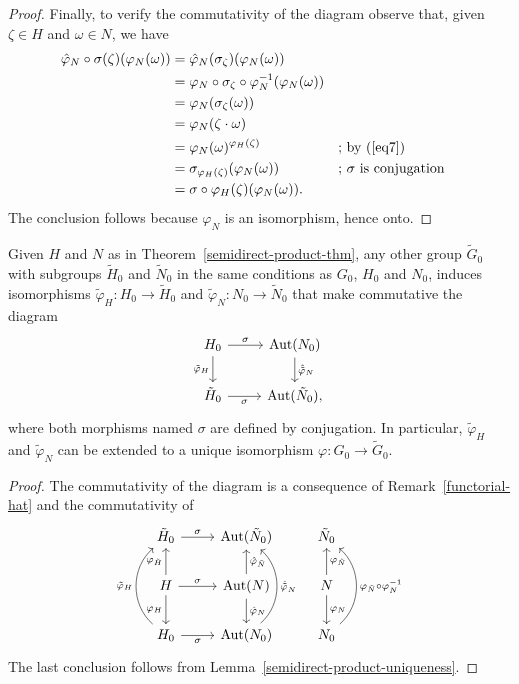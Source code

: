 \begin{proof}
Finally, to verify the commutativity of the diagram observe that, given $\zeta\in H$ and $\omega\in N$, we have
\begin{align*}
    \hat\varphi_N\circ\sigma(\zeta)(\varphi_N(\omega))
        &= \hat\varphi_N(\sigma_\zeta)(\varphi_N(\omega))\\
        &= \varphi_N\circ\sigma_\zeta\circ\varphi_N^{-1}(\varphi_N(\omega))\\
        &= \varphi_N(\sigma_\zeta(\omega))\\
        &= \varphi_N(\zeta\cdot\omega)\\
        &= \varphi_N(\omega)^{\varphi_H(\zeta)}
            &&\text{; by $(\ref{eq7})$}\\
        &= \sigma_{\varphi_H(\zeta)}(\varphi_N(\omega))
            &&\text{; $\sigma$ is conjugation}\\
        &= \sigma\circ\varphi_H(\zeta)(\varphi_N(\omega)).
\end{align*}
The conclusion follows because $\varphi_N$ is an isomorphism, hence onto.  \end{proof}

\begin{cor}
    Given $H$ and $N$ as in {\upshape Theorem~\ref{semidirect-product-thm}}, any other group $\tilde G_0$ with subgroups $\tilde H_0$ and $\tilde N_0$ in the same conditions as $G_0$, $H_0$ and $N_0$, induces isomorphisms $\tilde\varphi_H\colon H_0\to\tilde H_0$ and $\tilde\varphi_N\colon N_0\to\tilde N_0$ that make commutative the diagram
    $$
        \begin{tikzcd}
            H_0\arrow[r,"\sigma"]\arrow[d,"\tilde\varphi_H"']
                &\Aut(N_0)\arrow[d,"\hat{\tilde\varphi}_N"]
                \\
            \tilde H_0\arrow[r,"\sigma"']
                &\Aut(\tilde N_0),
        \end{tikzcd}
    $$
    where both morphisms named\/ $\sigma$ are defined by conjugation. In particular, $\tilde\varphi_H$ and $\tilde\varphi_N$ can be extended to a unique isomorphism $\varphi\colon G_0\to\tilde G_0$.
\end{cor}

\begin{proof} The commutativity of the diagram is a consequence of Remark~\ref{functorial-hat} and the commutativity of
$$
    \begin{tikzcd}
        \tilde H_0\arrow[r,"\sigma"]
            &\Aut(\tilde N_0)
            &\tilde N_0 \\
        H\arrow[d,"\varphi_H"']\arrow[r,"\sigma"]\arrow[u,"\varphi_{\tilde{H}}"]
            &\Aut(N)\arrow[d,"\hat{\varphi}_N"]\arrow[u,"\hat{\varphi}_{\tilde{N}}"']
            &N\arrow[u,"\varphi_{\tilde{N}}"']\arrow[d,"\varphi_N"] \\
        H_0\arrow[r,"\sigma"']\arrow[uu,"\tilde{\varphi}_H",bend left=49]
            &\Aut(N_0)\arrow[uu,"{\hat{\tilde{\varphi}}}_N"',bend right=49]
        &N_0\arrow[uu,"\varphi_{\tilde{N}}\circ\varphi_N^{-1}"',bend right=49]
    \end{tikzcd}
$$
The last conclusion follows from Lemma~\ref{semidirect-product-uniqueness}.  \end{proof}


